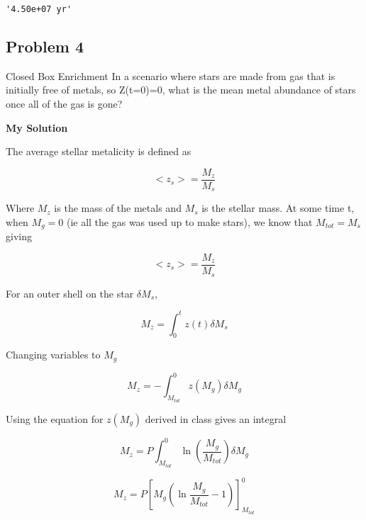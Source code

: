 \documentclass[11pt]{article}
\makeatletter
\newcommand{\boxspacing}{\kern\kvtcb@left@rule\kern\kvtcb@boxsep}
\newcommand{\prompt}[4]{
        {\ttfamily\llap{{\color{#2}[#3]:\hspace{3pt}#4}}\vspace{-\baselineskip}}
    }
\makeatother
\begin{document}
            \begin{tcolorbox}[breakable, size=fbox, boxrule=.5pt, pad at break*=1mm, opacityfill=0]
\prompt{Out}{outcolor}{16}{\boxspacing}
\begin{Verbatim}[commandchars=\\\{\}]
'4.50e+07 yr'
\end{Verbatim}
\end{tcolorbox}
        
    \subsection{Problem 4}\label{problem-4}

Closed Box Enrichment In a scenario where stars are made from gas that
is initially free of metals, so Z(t=0)=0, what is the mean metal
abundance of stars once all of the gas is gone?

\textbf{My Solution}

The average stellar metalicity is defined as

\begin{equation}
<z_s> = \frac{M_z}{M_s}
\end{equation}

Where \(M_z\) is the mass of the metals and \(M_s\) is the stellar mass.
At some time t, when \(M_g = 0\) (ie all the gas was used up to make
stars), we know that \(M_{tot} = M_s\) giving

\begin{equation}
<z_s> = \frac{M_z}{M_s}
\end{equation}

For an outer shell on the star \(\delta M_s\),

\begin{equation}
M_z = \int_0^t z(t) \delta M_s
\end{equation}

Changing variables to \(M_g\)

\begin{equation}
M_z = -\int_{M_{tot}}^0 z(M_g) \delta M_g
\end{equation}

Using the equation for \(z(M_g)\) derived in class gives an integral

\begin{equation}
M_z = P \int_{M_{tot}}^0 \ln\left(\frac{M_g}{M_{tot}}\right) \delta M_g
\end{equation}

\begin{equation}
M_z = P \left[ M_g \left( \ln\frac{M_g}{M_{tot}} - 1 \right) \right]^0_{M_{tot}}
\end{equation}
\end{document}
